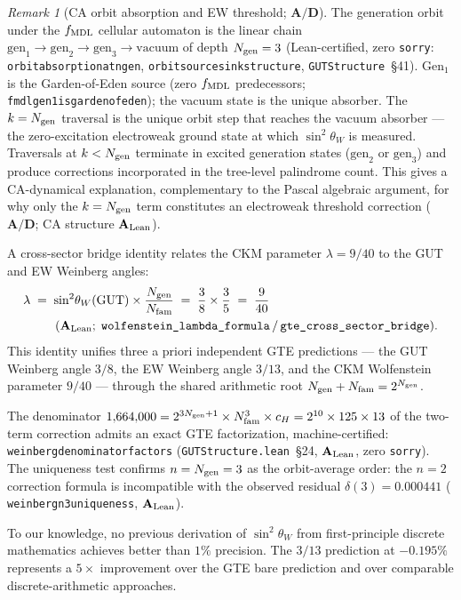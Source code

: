 \documentclass[11pt]{article}
\theoremstyle{remark}
\newtheorem{remark}[theorem]{Remark}
\newcommand{\Ngen}{N_{\rm gen}}
\newcommand{\Nfam}{N_{\rm fam}}
\newcommand{\cH}{c_H}
\newcommand{\lean}[1]{%
  \penalty-100
  \begingroup\def\_{\textunderscore\allowbreak}\texttt{#1}\endgroup}
\newcommand{\sinwsq}{\sin^2\!\theta_W}
\newcommand{\CatAL}{\ensuremath{\textbf{A}_{\rm Lean}}}
\newcommand{\CatAD}{\textbf{A/D}}
\begin{document}
\begin{remark}[CA orbit absorption and EW threshold; $\CatAD$]
\label{rem:orbit_absorption_ew}
The generation orbit under the $f_{\rm MDL}$ cellular automaton is the linear chain
$\mathrm{gen}_1 \to \mathrm{gen}_2 \to \mathrm{gen}_3 \to \mathrm{vacuum}$
of depth $\Ngen = 3$ (Lean-certified, zero \texttt{sorry}:
\lean{orbit\_absorption\_at\_ngen}, \lean{orbit\_source\_sink\_structure},
\texttt{GUTStructure}~\S41).
$\mathrm{Gen}_1$ is the Garden-of-Eden source (zero $f_{\rm MDL}$ predecessors;
\lean{fmdl\_gen1\_is\_garden\_of\_eden}); the vacuum state is the unique absorber.
The $k = \Ngen$ traversal is the unique orbit step that reaches the vacuum absorber
--- the zero-excitation electroweak ground state at which $\sinwsq$ is measured.
Traversals at $k < \Ngen$ terminate in excited generation states
($\mathrm{gen}_2$ or $\mathrm{gen}_3$) and produce corrections incorporated in the
tree-level palindrome count.
This gives a CA-dynamical explanation, complementary to the Pascal algebraic argument,
for why only the $k = \Ngen$ term constitutes an electroweak threshold correction
($\CatAD$; CA structure $\CatAL$).
\end{remark}

A cross-sector bridge identity relates the CKM parameter $\lambda = 9/40$ to the GUT and EW Weinberg angles:
\begin{align}
  \lambda &\;=\; \sin^2\!\theta_W(\text{GUT}) \times \frac{\Ngen}{\Nfam}
           \;=\; \frac{3}{8} \times \frac{3}{5} \;=\; \frac{9}{40} \notag\\
          &\qquad (\CatAL;\;\lean{wolfenstein\_lambda\_formula}\,/\,\lean{gte\_cross\_sector\_bridge}).
\end{align}
This identity unifies three a priori independent GTE predictions — the GUT Weinberg angle $3/8$, the EW Weinberg angle $3/13$, and the CKM Wolfenstein parameter $9/40$ — through the shared arithmetic root $\Ngen + \Nfam = 2^{\Ngen}$.

The denominator $1{,}664{,}000 = 2^{3\Ngen+1} \times \Nfam^3 \times \cH = 2^{10} \times 125 \times 13$ of the two-term correction admits an exact GTE factorization, machine-certified: \lean{weinberg\_denominator\_factors} (\texttt{GUTStructure.lean}~\S24, $\CatAL$, zero \texttt{sorry}).
The uniqueness test confirms $n = \Ngen = 3$ as the orbit-average order: the $n=2$ correction formula is incompatible with the observed residual $\delta(3) = 0.000441$ (\lean{weinberg\_n3\_uniqueness}, $\CatAL$).

To our knowledge, no previous derivation of $\sinwsq$ from first-principle discrete
mathematics achieves better than $1\%$ precision.
The $3/13$ prediction at $-0.195\%$ represents a $5\times$ improvement over the
GTE bare prediction and over comparable discrete-arithmetic approaches.
\end{document}
